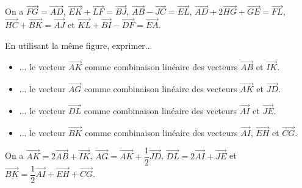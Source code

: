 \documentclass[11pt,fleqn, openany]{book} %
\begin{document}
\begin{solution}On a  $\overrightarrow{FG} = \overrightarrow{AD}$, $\overrightarrow{EK}+\overrightarrow{LF}= \overrightarrow{BJ}$, $\overrightarrow{AB}- \overrightarrow{JC} = \overrightarrow{EL}$,  $\overrightarrow{AD}+2\overrightarrow{HG}+\overrightarrow{GE}=\overrightarrow{FL}$, $\overrightarrow{HC}+\overrightarrow{BK} = \overrightarrow{AJ}$ et $\overrightarrow{KL} + \overrightarrow{BI} - \overrightarrow{DF} = \overrightarrow{EA}$.\end{solution}

\begin{exercise}[topic=geo01]
En utilisant la même figure, exprimer...
\begin{itemize}
\item ... le vecteur $\overrightarrow{AK}$ comme combinaison linéaire des vecteurs $\overrightarrow{AB}$ et $\overrightarrow{IK}$.
\item ... le vecteur $\overrightarrow{AG}$ comme combinaison linéaire des vecteurs $\overrightarrow{AK}$ et $\overrightarrow{JD}$.
\item ... le vecteur $\overrightarrow{DL}$ comme combinaison linéaire des vecteurs $\overrightarrow{AI}$ et $\overrightarrow{JE}$.
\item ... le vecteur $\overrightarrow{BK}$ comme combinaison linéaire des vecteurs $\overrightarrow{AI}$, $\overrightarrow{EH}$ et $\overrightarrow{CG}$.
\end{itemize}\end{exercise}

\begin{solution}On a $\overrightarrow{AK}=2\overrightarrow{AB}+\overrightarrow{IK}$, $\overrightarrow{AG}=\overrightarrow{AK}+\dfrac{1}{2}\overrightarrow{JD}$, $\overrightarrow{DL}=2\overrightarrow{AI}+\overrightarrow{JE}$ et $\overrightarrow{BK}=\dfrac{1}{2}\overrightarrow{AI}+\overrightarrow{EH}+\overrightarrow{CG}$.\end{solution}
\end{document}
